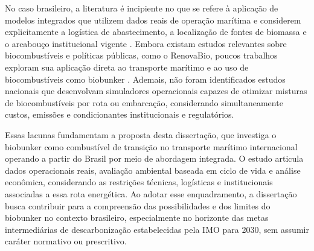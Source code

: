 No caso brasileiro, a literatura é incipiente no que se refere à aplicação de modelos integrados que utilizem dados reais de operação marítima e considerem explicitamente a logística de abastecimento, a localização de fontes de biomassa e o arcabouço institucional vigente \citep{carvalho_biofuels_2021,grangeia_brazilian_2022,cesilla_de_souza_technical-economic_2024}. Embora existam estudos relevantes sobre biocombustíveis e políticas públicas, como o RenovaBio, poucos trabalhos exploram sua aplicação direta ao transporte marítimo e ao uso de biocombustíveis como biobunker \citep{brasil_lei_2017,grangeia_brazilian_2022}. Ademais, não foram identificados estudos nacionais que desenvolvam simuladores operacionais capazes de otimizar misturas de biocombustíveis por rota ou embarcação, considerando simultaneamente custos, emissões e condicionantes institucionais e regulatórios.

Essas lacunas fundamentam a proposta desta dissertação, que investiga o biobunker como combustível de transição no transporte marítimo internacional operando a partir do Brasil por meio de abordagem integrada. O estudo articula dados operacionais reais, avaliação ambiental baseada em ciclo de vida e análise econômica, considerando as restrições técnicas, logísticas e institucionais associadas a essa rota energética. Ao adotar esse enquadramento, a dissertação busca contribuir para a compreensão das possibilidades e dos limites do biobunker no contexto brasileiro, especialmente no horizonte das metas intermediárias de descarbonização estabelecidas pela \gls{IMO} para 2030, sem assumir caráter normativo ou prescritivo.
